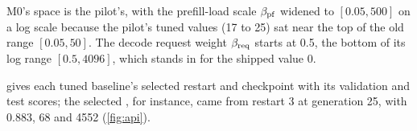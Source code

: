 M0's space is the pilot's, with the prefill-load scale $\beta_{\mathrm{pf}}$ widened to $[0.05, 500]$ on a log
scale because the pilot's tuned values (17 to 25) sat near the top of the old range $[0.05, 50]$.
The decode request weight $\beta_{\mathrm{req}}$ starts at 0.5, the bottom of its log range $[0.5, 4096]$, which
stands in for the shipped value 0.

 gives each tuned baseline's selected restart and checkpoint with its
validation and test scores; the selected , for instance, came from restart 3 at
generation 25, with  0.883,  68 and
 4552 (\cref{fig:api}).

